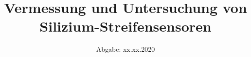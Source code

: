 

\subject{Lehrstuhlversuch im SS2020}
\title{Vermessung und Untersuchung von Silizium-Streifensensoren}
\date{%
  Abgabe: xx.xx.2020
}



\maketitle
\thispagestyle{empty}
\tableofcontents
\newpage







%


